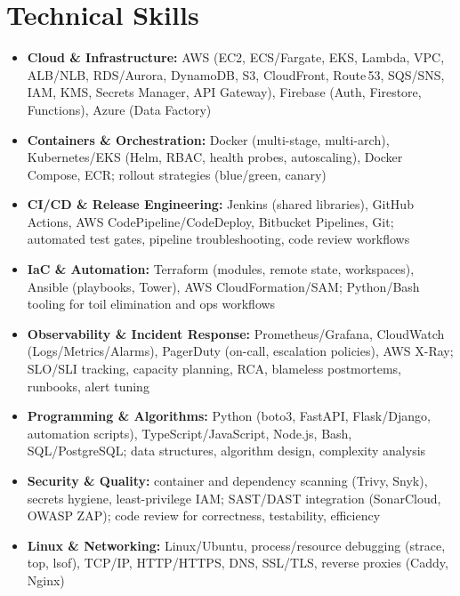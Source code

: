 \documentclass[10pt,a4paper]{article}
\begin{document}
\section*{Technical Skills}
\begin{itemize}
  \item \textbf{Cloud \& Infrastructure:} AWS (EC2, ECS/Fargate, EKS, Lambda, VPC, ALB/NLB, RDS/Aurora, DynamoDB, S3, CloudFront, Route\,53, SQS/SNS, IAM, KMS, Secrets Manager, API Gateway), Firebase (Auth, Firestore, Functions), Azure (Data Factory)
  \item \textbf{Containers \& Orchestration:} Docker (multi-stage, multi-arch), Kubernetes/EKS (Helm, RBAC, health probes, autoscaling), Docker Compose, ECR; rollout strategies (blue/green, canary)
  \item \textbf{CI/CD \& Release Engineering:} Jenkins (shared libraries), GitHub Actions, AWS CodePipeline/CodeDeploy, Bitbucket Pipelines, Git; automated test gates, pipeline troubleshooting, code review workflows
  \item \textbf{IaC \& Automation:} Terraform (modules, remote state, workspaces), Ansible (playbooks, Tower), AWS CloudFormation/SAM; Python/Bash tooling for toil elimination and ops workflows
  \item \textbf{Observability \& Incident Response:} Prometheus/Grafana, CloudWatch (Logs/Metrics/Alarms), PagerDuty (on-call, escalation policies), AWS X-Ray; SLO/SLI tracking, capacity planning, RCA, blameless postmortems, runbooks, alert tuning
  \item \textbf{Programming \& Algorithms:} Python (boto3, FastAPI, Flask/Django, automation scripts), TypeScript/JavaScript, Node.js, Bash, SQL/PostgreSQL; data structures, algorithm design, complexity analysis
  \item \textbf{Security \& Quality:} container and dependency scanning (Trivy, Snyk), secrets hygiene, least-privilege IAM; SAST/DAST integration (SonarCloud, OWASP ZAP); code review for correctness, testability, efficiency
  \item \textbf{Linux \& Networking:} Linux/Ubuntu, process/resource debugging (strace, top, lsof), TCP/IP, HTTP/HTTPS, DNS, SSL/TLS, reverse proxies (Caddy, Nginx)
\end{itemize}

\end{document}
